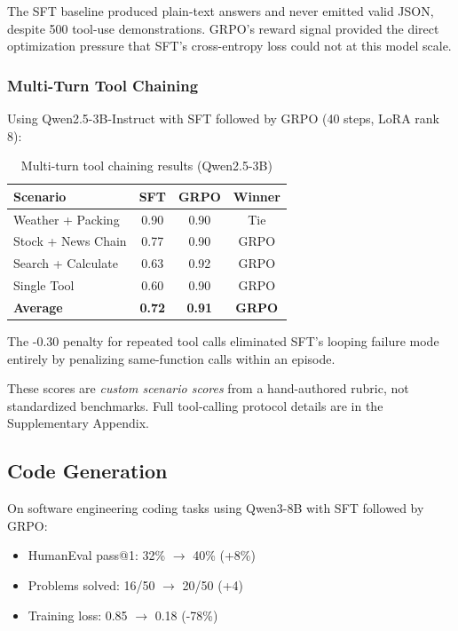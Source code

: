\documentclass{article}
\begin{document}
The SFT baseline produced plain-text answers and never emitted valid JSON, despite 500 tool-use demonstrations. GRPO's reward signal provided the direct optimization pressure that SFT's cross-entropy loss could not at this model scale.

\subsubsection{Multi-Turn Tool Chaining}

Using Qwen2.5-3B-Instruct with SFT followed by GRPO (40 steps, LoRA rank 8):

\begin{table}[htbp]
    \centering
    \caption{Multi-turn tool chaining results (Qwen2.5-3B)}
    \begin{tabular}{lccc}
        \toprule
        Scenario & SFT & GRPO & Winner \\
        \midrule
        Weather + Packing & 0.90 & 0.90 & Tie \\
        Stock + News Chain & 0.77 & 0.90 & GRPO \\
        Search + Calculate & 0.63 & 0.92 & GRPO \\
        Single Tool & 0.60 & 0.90 & GRPO \\
        \textbf{Average} & \textbf{0.72} & \textbf{0.91} & \textbf{GRPO} \\
        \bottomrule
    \end{tabular}
    \label{tab:multi_turn}
\end{table}

The -0.30 penalty for repeated tool calls eliminated SFT's looping failure mode entirely by penalizing same-function calls within an episode.

These scores are \emph{custom scenario scores} from a hand-authored rubric, not standardized benchmarks. Full tool-calling protocol details are in the Supplementary Appendix.

\subsection{Code Generation}

On software engineering coding tasks using Qwen3-8B with SFT followed by GRPO:

\begin{itemize}
    \item HumanEval pass@1: 32\% $\rightarrow$ 40\% (+8\%)
    \item Problems solved: 16/50 $\rightarrow$ 20/50 (+4)
    \item Training loss: 0.85 $\rightarrow$ 0.18 (-78\%)
\end{itemize}
\end{document}
